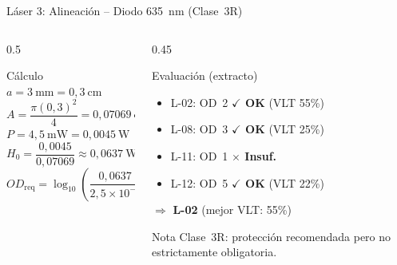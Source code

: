 \documentclass[aspectratio=169,12pt]{beamer}
\begin{document}
\begin{frame}{Láser 3: Alineación -- Diodo 635~nm (Clase~3R)}
	\begin{columns}
		\begin{column}{0.5\textwidth}
			\begin{block}{Cálculo}
				$a = 3~\text{mm} = 0{,}3~\text{cm}$
				\[A = \frac{\pi (0{,}3)^2}{4} = 0{,}07069~\text{cm}^2\]
				$P = 4{,}5~\text{mW} = 0{,}0045~\text{W}$
				\[H_0 = \frac{0{,}0045}{0{,}07069} \approx 0{,}0637~\text{W/cm}^2\]
				\[OD_\mathrm{req} = \log_{10}\!\left(\frac{0{,}0637}{2{,}5\times10^{-3}}\right) \approx \mathbf{1{,}41}\]
			\end{block}
		\end{column}
		\begin{column}{0.45\textwidth}
			\begin{exampleblock}{Evaluación (extracto)}
				\begin{itemize}
					\item L-02: OD~2 \textcolor{aerogreen}{\textbf{$\checkmark$ OK}} (VLT 55\%)
					\item L-08: OD~3 \textcolor{aerogreen}{\textbf{$\checkmark$ OK}} (VLT 25\%)
					\item L-11: OD~1 \textcolor{aerored}{\textbf{$\times$ Insuf.}}
					\item L-12: OD~5 \textcolor{aerogreen}{\textbf{$\checkmark$ OK}} (VLT 22\%)
				\end{itemize}
			\end{exampleblock}
			\vspace{0.2cm}
			$\Rightarrow$ \textbf{L-02} (mejor VLT: 55\%)

			\vspace{0.2cm}
			\begin{block}{Nota}
				Clase~3R: protección recomendada pero no estrictamente obligatoria.
			\end{block}
		\end{column}
	\end{columns}
\end{frame}
\end{document}
